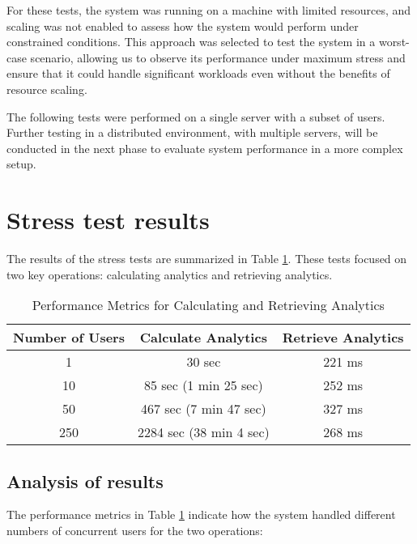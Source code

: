For these tests, the system was running on a machine with limited resources, and scaling was not enabled to assess how the system would perform under constrained conditions. This approach was selected to test the system in a worst-case scenario, allowing us to observe its performance under maximum stress and ensure that it could handle significant workloads even without the benefits of resource scaling.

The following tests were performed on a single server with a subset of users. Further testing in a distributed environment, with multiple servers, will be conducted in the next phase to evaluate system performance in a more complex setup.

\section{Stress test results}
The results of the stress tests are summarized in Table \ref{table:performance_metrics}. These tests focused on two key operations: calculating analytics and retrieving analytics.

\begin{table}[htbp]
\centering
\begin{tabular}{|c|c|c|}
\hline
\textbf{Number of Users} & \textbf{Calculate Analytics} & \textbf{Retrieve Analytics} \\
\hline
1   & 30 sec              & 221 ms          \\
\hline
10  & 85 sec (1 min 25 sec)& 252 ms          \\
\hline
50  & 467 sec (7 min 47 sec)& 327 ms          \\
\hline
250 & 2284 sec (38 min 4 sec)& 268 ms          \\
\hline
\end{tabular}
\caption{Performance Metrics for Calculating and Retrieving Analytics}
\label{table:performance_metrics}
\end{table}

\subsection{Analysis of results}
The performance metrics in Table \ref{table:performance_metrics} indicate how the system handled different numbers of concurrent users for the two operations:

